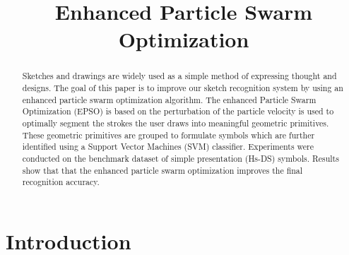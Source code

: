 \documentclass[10pt]{article}
\title{Enhanced Particle Swarm Optimization}
\begin{document}
\maketitle
 \begin{abstract}

Sketches and drawings are widely used as a simple method of expressing thought and designs. The goal of this paper is to improve our sketch recognition system by using an enhanced particle swarm optimization algorithm. The enhanced Particle Swarm Optimization (EPSO) is based on the perturbation of the particle velocity is used to optimally segment the strokes the user draws into meaningful geometric primitives.  These geometric primitives are grouped to formulate symbols which are further identified using a Support Vector Machines (SVM) classifier. Experiments were conducted on the benchmark dataset of simple presentation (Hs-DS) symbols. Results show that that the enhanced particle swarm optimization improves the final recognition accuracy. 
\end{abstract}
 \section{Introduction}
\end{document}
